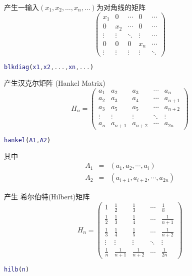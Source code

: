 \documentclass{ctexart}
\begin{document}
  产生一输入$(x_1,x_2,\dots,x_n,\dots)$为对角线的矩阵
  $$\left(\begin{array}{ccccc}
  x_1    & 0      & \cdots & 0      & \cdots \\
  0      & x_2    & \cdots & 0      & \cdots \\
  \vdots & \vdots & \ddots & \vdots & \cdots \\
  0      & 0      & 0      & x_n    & \cdots \\
  \vdots & \vdots & \vdots & \vdots & \ddots
  \end{array}\right)$$
  \begin{lstlisting}[language=matlab]
    blkdiag(x1,x2,...,xn,...)
  \end{lstlisting}
  产生汉克尔矩阵 (Hankel Matrix)
  $$H_n=\left(\begin{array}{ccccc}
  a_1    & a_2     & a_3      & \cdots & a_n     \\
  a_2    & a_3     & a_4      & \cdots & a_{n+1} \\
  a_3    & a_5     & a_5      & \cdots & a_{n+2} \\
  \vdots & \vdots  & \vdots   & \ddots & \vdots  \\
  a_n    & a_{n+1} & a_{n+2}  & \cdots & a_{2n}
  \end{array}\right)$$
  \begin{lstlisting}[language=matlab]
    hankel(A1,A2)
  \end{lstlisting}
  其中
  \begin{eqnarray*}
  A_1 &=& (a_1,a_2,\cdots,a_i) \\
  A_2 &=& (a_{i+1},a_{i+2},\cdots,a_{2n})
  \end{eqnarray*}

  产生 希尔伯特(Hilbert)矩阵
  $$H_n=\left(\begin{array}{ccccc}
  1           & \frac{1}{2}   & \frac{1}{3}   & \cdots & \frac{1}{n}   \\
  \frac{1}{2} & \frac{1}{3}   & \frac{1}{4}   & \cdots & \frac{1}{n+1} \\
  \frac{1}{3} & \frac{1}{4}   & \frac{1}{5}   & \cdots & \frac{1}{n+2} \\
  \vdots      & \vdots        & \vdots        & \ddots & \vdots        \\
  \frac{1}{n} & \frac{1}{n+1} & \frac{1}{n+2} & \cdots & \frac{1}{2n}
  \end{array}\right)$$
  \begin{lstlisting}[language=matlab]
  hilb(n)
  \end{lstlisting}
\end{document}
